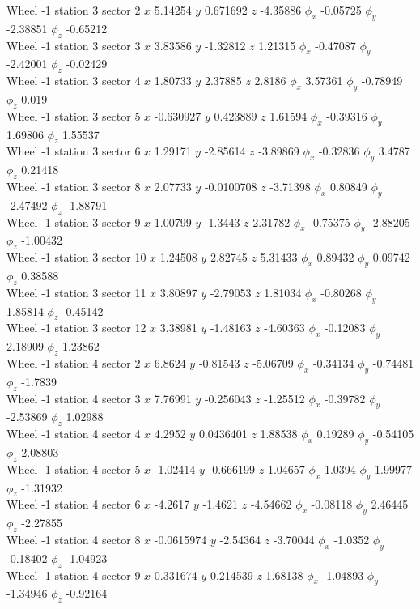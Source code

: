 \documentclass[compress]{beamer}
\begin{document}
\begin{frame}
Wheel -1 station 3 sector 2 $x$ 5.14254 $y$ 0.671692 $z$ -4.35886 $\phi_x$ -0.05725 $\phi_y$ -2.38851 $\phi_z$ -0.65212 \\
Wheel -1 station 3 sector 3 $x$ 3.83586 $y$ -1.32812 $z$ 1.21315 $\phi_x$ -0.47087 $\phi_y$ -2.42001 $\phi_z$ -0.02429 \\
Wheel -1 station 3 sector 4 $x$ 1.80733 $y$ 2.37885 $z$ 2.8186 $\phi_x$ 3.57361 $\phi_y$ -0.78949 $\phi_z$ 0.019 \\
Wheel -1 station 3 sector 5 $x$ -0.630927 $y$ 0.423889 $z$ 1.61594 $\phi_x$ -0.39316 $\phi_y$ 1.69806 $\phi_z$ 1.55537 \\
Wheel -1 station 3 sector 6 $x$ 1.29171 $y$ -2.85614 $z$ -3.89869 $\phi_x$ -0.32836 $\phi_y$ 3.4787 $\phi_z$ 0.21418 \\
Wheel -1 station 3 sector 8 $x$ 2.07733 $y$ -0.0100708 $z$ -3.71398 $\phi_x$ 0.80849 $\phi_y$ -2.47492 $\phi_z$ -1.88791 \\
Wheel -1 station 3 sector 9 $x$ 1.00799 $y$ -1.3443 $z$ 2.31782 $\phi_x$ -0.75375 $\phi_y$ -2.88205 $\phi_z$ -1.00432 \\
Wheel -1 station 3 sector 10 $x$ 1.24508 $y$ 2.82745 $z$ 5.31433 $\phi_x$ 0.89432 $\phi_y$ 0.09742 $\phi_z$ 0.38588 \\
Wheel -1 station 3 sector 11 $x$ 3.80897 $y$ -2.79053 $z$ 1.81034 $\phi_x$ -0.80268 $\phi_y$ 1.85814 $\phi_z$ -0.45142 \\
Wheel -1 station 3 sector 12 $x$ 3.38981 $y$ -1.48163 $z$ -4.60363 $\phi_x$ -0.12083 $\phi_y$ 2.18909 $\phi_z$ 1.23862 \\
Wheel -1 station 4 sector 2 $x$ 6.8624 $y$ -0.81543 $z$ -5.06709 $\phi_x$ -0.34134 $\phi_y$ -0.74481 $\phi_z$ -1.7839 \\
Wheel -1 station 4 sector 3 $x$ 7.76991 $y$ -0.256043 $z$ -1.25512 $\phi_x$ -0.39782 $\phi_y$ -2.53869 $\phi_z$ 1.02988 \\
Wheel -1 station 4 sector 4 $x$ 4.2952 $y$ 0.0436401 $z$ 1.88538 $\phi_x$ 0.19289 $\phi_y$ -0.54105 $\phi_z$ 2.08803 \\
Wheel -1 station 4 sector 5 $x$ -1.02414 $y$ -0.666199 $z$ 1.04657 $\phi_x$ 1.0394 $\phi_y$ 1.99977 $\phi_z$ -1.31932 \\
Wheel -1 station 4 sector 6 $x$ -4.2617 $y$ -1.4621 $z$ -4.54662 $\phi_x$ -0.08118 $\phi_y$ 2.46445 $\phi_z$ -2.27855 \\
Wheel -1 station 4 sector 8 $x$ -0.0615974 $y$ -2.54364 $z$ -3.70044 $\phi_x$ -1.0352 $\phi_y$ -0.18402 $\phi_z$ -1.04923 \\
Wheel -1 station 4 sector 9 $x$ 0.331674 $y$ 0.214539 $z$ 1.68138 $\phi_x$ -1.04893 $\phi_y$ -1.34946 $\phi_z$ -0.92164 \\

\end{frame}
\end{document}
